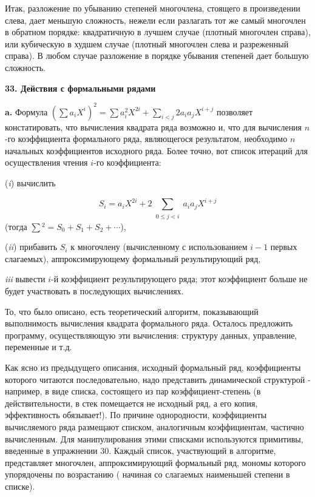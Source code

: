 Итак, разложение по убыванию степеней многочлена, стоящего в произведении
слева, дает меньшую сложность, нежели если разлагать тот же самый многочлен
в обратном порядке: квадратичную в лучшем случае (плотный многочлен справа),
или кубическую в худшем случае (плотный многочлен слева и разреженный справа).
В любом случае разложение в порядке убывания степеней дает большую сложность.\newline

\noindent\textbf{33. Действия с формальными рядами}\newline

\textbf{a.} Формула $(\sum a_iX^i)^2 = \sum a_i^2 X^{2i} + \sum_{i < j}2a_i a_j X^{i+j}$ позволяет констатировать,
что вычисления квадрата ряда возможно и, что для вычисления $n$-го коэффициента
формального ряда, являющегося результатом, необходимо $n$ начальных коэффициентов исходного ряда. Более точно, вот список итераций для осуществления чтения $i$-го коэффициента:

(\textit{i}) вычислить

\begin{equation*}
S_i = a_i X^{2i} + 2 \sum_{\substack{0 \leqslant j < i}} a_i a_j X^{i+j}
\end{equation*}
(тогда \small{$\sum$}$^2 = S_0 + S_1 + S_2 + \cdots$),

(\textit{ii}) прибавить $S_i$ к многочлену (вычисленному с использованием $i - 1$ первых слагаемых),
аппроксимирующему формальный результирующий ряд,

\textit{iii} вывести $i$-й коэффициент результирующего ряда; этот коэффициент
больше не будет участвовать в последующих вычислениях.

То, что было описано, есть теоретический алгоритм, показывающий выполнимость
вычисления квадрата формального ряда. Осталось предложить программу,
осуществляющую эти вычисления: структуру данных, управление, переменные и т.д.

Как ясно из предыдущего описания, исходный формальный ряд, коэффициенты которого
читаются последовательно, надо представить динамической структурой - например,
в виде списка, состоящего из пар коэффициент-степень (в действительности,
в стек помещается не исходный ряд, а его копия, эффективность обязывает!).
По причине однородности, коэффициенты вычисляемого ряда размещают списком,
аналогичным коэффициентам, частично вычисленным. Для манипулирования этими
списками используются примитивы, введенные в упражнении 30. Каждый список,
участвующий в алгоритме, представляет многочлен, аппроксимирующий формальный ряд, мономы которого
упорядочены по возрастанию ( начиная со слагаемых наименьшей степени в списке).
\newpage

